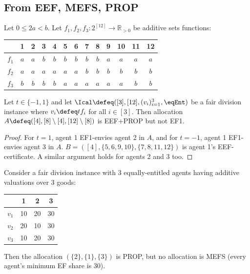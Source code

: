 \subsection{From EEF, MEFS, PROP}
\label{sec:cex-extra:from-eef-mefs-prop}

\begin{lemma}
\label{cex:eef-not-ef1}
Let $0 \le 2a < b$. Let $f_1, f_2, f_3: 2^{[12]} \to \mathbb{R}_{>0}$ be additive sets functions:

\begin{tabular}{c|cccc|cccc|cccc}
& 1 & 2 & 3 & 4 & 5 & 6 & 7 & 8 & 9 & 10 & 11 & 12
\\ \hline $f_1$ & $a$ & $a$ & $b$ & $b$ & $b$ & $b$ & $b$ & $b$ & $a$ & $a$ & $a$ & $a$
\\ $f_2$ & $a$ & $a$ & $a$ & $a$ & $a$ & $a$ & $b$ & $b$ & $b$ & $b$ & $b$ & $b$
\\ $f_3$ & $b$ & $b$ & $b$ & $b$ & $a$ & $a$ & $a$ & $a$ & $a$ & $a$ & $b$ & $b$
\end{tabular}

Let $t \in \{-1, 1\}$ and let $\Ical \defeq ([3], [12], (v_i)_{i=1}^3, \eqEnt)$
be a fair division instance where $v_i \defeq tf_i$ for all $i \in [3]$.
Then allocation
$A \defeq ([4], [8] \setminus [4], [12] \setminus [8])$ is EEF+PROP but not EF1.
\end{lemma}
\begin{proof}
For $t = 1$, agent 1 EF1-envies agent 2 in $A$,
and for $t = -1$, agent 1 EF1-envies agent 3 in $A$.
$B = ([4], \{5, 6, 9, 10\}, \{7, 8, 11, 12\})$ is agent 1's EEF-certificate.
A similar argument holds for agents 2 and 3 too.
\end{proof}

\begin{example}
\label{cex:prop-not-mefs-goods}
Consider a fair division instance with 3 equally-entitled agents
having additive valuations over 3 goods:

\begin{tabular}{c|ccc}
& 1 & 2 & 3
\\ \hline $v_1$ & 10 & 20 & 30
\\ $v_2$ & 20 & 10 & 30
\\ $v_3$ & 10 & 20 & 30
\end{tabular}

Then the allocation $(\{2\}, \{1\}, \{3\})$ is PROP, but no allocation is MEFS
(every agent's minimum EF share is 30).
\end{example}

